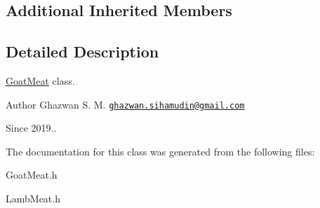 \subsection*{Additional Inherited Members}


\subsection{Detailed Description}
\hyperlink{classGoatMeat}{Goat\+Meat} class.

\begin{DoxyAuthor}{Author}
Ghazwan S. M. \href{mailto:ghazwan.sihamudin@gmail.com}{\tt ghazwan.\+sihamudin@gmail.\+com} 
\end{DoxyAuthor}
\begin{DoxySince}{Since}
2019.. 
\end{DoxySince}


The documentation for this class was generated from the following files\+:\begin{DoxyCompactItemize}
\item 
Goat\+Meat.\+h\item 
Lamb\+Meat.\+h\end{DoxyCompactItemize}
